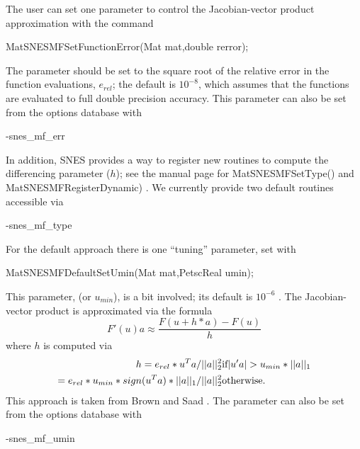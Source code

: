 The user can set one parameter to control the Jacobian-vector
product approximation with the command
\begin{tabbing}
  MatSNESMFSetFunctionError(Mat mat,double rerror);
\end{tabbing}
The parameter  should be set to the square root of the 
relative error in the function evaluations, $e_{rel}$; the default is $ 10^{-8} $, 
which assumes that the functions are evaluated to full double precision accuracy. 
This parameter can also be set from the options database with 
\begin{tabbing}
   -snes\_mf\_err 
\end{tabbing}

In addition, SNES provides a way to register new routines to compute the differencing parameter ($h$);
see the manual page for MatSNESMFSetType() and MatSNESMFRegisterDynamic) 
. We currently provide two default routines accessible via
\begin{tabbing}
  -snes\_mf\_type 
\end{tabbing}
For the default approach there is one ``tuning'' parameter, set with 
\begin{tabbing}
  MatSNESMFDefaultSetUmin(Mat mat,PetscReal umin);
\end{tabbing}
This parameter,  (or $u_{min}$), is a bit involved; its default is 
$ 10^{-6} $ . The Jacobian-vector product is approximated via the formula
\[
    F'(u) a \approx \frac{F(u + h*a) - F(u)}{h}
\]
where $ h $ is computed via 
\begin{eqnarray*}
        h = e_{rel}*u^{T}a/||a||^2_2                       &    \hbox{if}  |u'a| > u_{min}*||a||_{1} \\
          = e_{rel}*u_{min}*sign(u^{T}a)*||a||_{1}/||a||^2_2  &    \hbox{otherwise}.
\end{eqnarray*}
This approach is taken from Brown and Saad \cite{brownsaad:90}.
The parameter can also be set from the options database with 
\begin{tabbing}
   -snes\_mf\_umin 
\end{tabbing}

